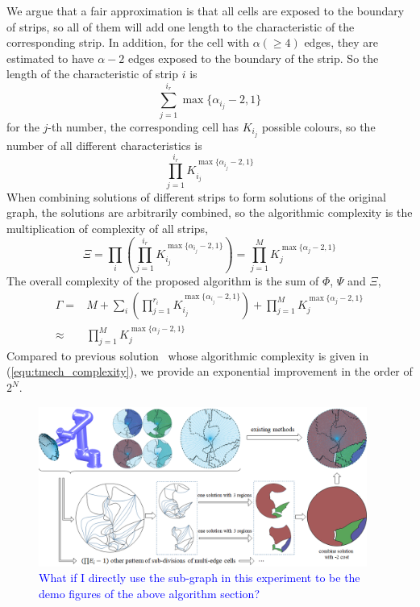 \documentclass[conference]{IEEEtran}
\begin{document}
We argue that a fair approximation is that all cells are exposed to the boundary of strips, so all of them will add one length to the characteristic of the corresponding strip. 
In addition, for the cell with $\alpha(\geq 4)$ edges, they are estimated to have $\alpha-2$ edges exposed to the boundary of the strip. 
So the length of the characteristic of strip $i$ is 
\begin{equation}
\sum\limits_{j = 1}^{i_r} \max\{\alpha_{i_j}-2, 1\}
\end{equation}
for the $j$-th number, the corresponding cell has $K_{i_j}$ possible colours, so the number of all different characteristics is 
\begin{equation}
\prod\limits_{j = 1}^{i_r} K_{i_j}^{\max\{\alpha_{i_j}-2, 1\}}
\end{equation}
When combining solutions of different strips to form solutions of the original graph, the solutions are arbitrarily combined, so the algorithmic complexity is the multiplication of complexity of all strips, 
\begin{equation}
\Xi = \prod\limits_i \left(\prod\limits_{j = 1}^{i_r} K_{i_j}^{\max\{\alpha_{i_j}-2, 1\}}\right)
= \prod\limits_{j = 1}^M K_j^{\max\{\alpha_j-2, 1\}}
\end{equation}
The overall complexity of the proposed algorithm is the sum of $\Phi$, $\Psi$ and $\Xi$, 
\begin{equation}
\begin{aligned}
\Gamma =& M + \sum\limits_{i} \left(\prod\limits_{j = 1}^{r_i} K_{i_j}^{\max\{\alpha_{i_j}-2, 1\}}\right) + \prod\limits_{j = 1}^M K_j^{\max\{\alpha_j-2, 1\}}\\
\approx&  \prod\limits_{j = 1}^M K_j^{\max\{\alpha_j-2, 1\}}
\end{aligned}
\end{equation}
Compared to previous solution~\cite{Yang2020Cellular} whose algorithmic complexity is given in (\ref{equ:tmech_complexity}), we provide an exponential improvement in the order of $2^N$. 

\begin{figure}[t]
\centering
\includegraphics[width = 0.96\textwidth]{figures/hat_exp/fig_hat}
\caption{\textcolor{blue}{What if I directly use the sub-graph in this experiment to be the demo figures of the above algorithm section? }}\label{fig:hat}
\end{figure}
\end{document}
